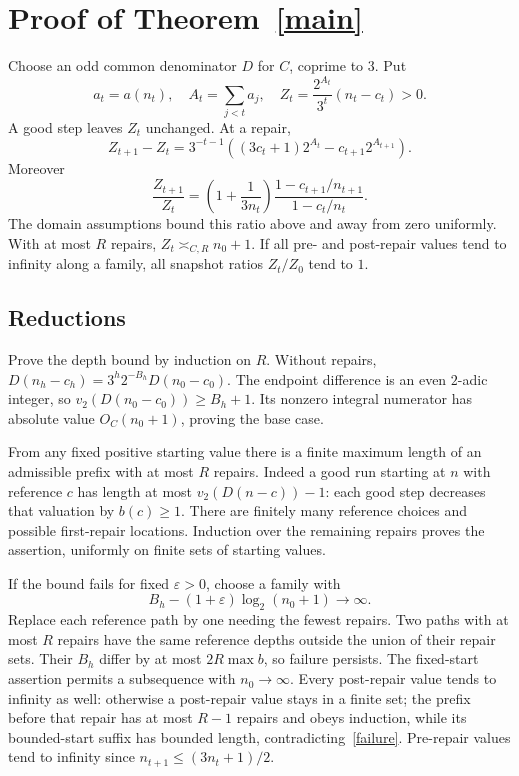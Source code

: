 \documentclass[11pt]{article}
\begin{document}
\section{Proof of Theorem~\ref{main}}
Choose an odd common denominator $D$ for $C$, coprime to $3$. Put
\[
a_t=a(n_t),\quad A_t=\sum_{j<t}a_j,\quad
Z_t=\frac{2^{A_t}}{3^t}(n_t-c_t)>0.
\]
A good step leaves $Z_t$ unchanged. At a repair,
\begin{equation}\label{increment}
Z_{t+1}-Z_t=3^{-t-1}
\left((3c_t+1)2^{A_t}-c_{t+1}2^{A_{t+1}}\right).
\end{equation}
Moreover
\begin{equation}\label{ratio}
\frac{Z_{t+1}}{Z_t}
=\left(1+\frac1{3n_t}\right)
\frac{1-c_{t+1}/n_{t+1}}{1-c_t/n_t}.
\end{equation}
The domain assumptions bound this ratio above and away from zero uniformly. With at most $R$ repairs, $Z_t\asymp_{C,R} n_0+1$.
If all pre- and post-repair values tend to infinity along a family, all snapshot ratios $Z_t/Z_0$ tend to $1$.

\subsection{Reductions}
Prove the depth bound by induction on $R$. Without repairs,
$D(n_h-c_h)=3^h2^{-B_h}D(n_0-c_0)$.
The endpoint difference is an even $2$-adic integer, so
$v_2(D(n_0-c_0))\ge B_h+1$.
Its nonzero integral numerator has absolute value $O_C(n_0+1)$, proving the base case.

From any fixed positive starting value there is a finite maximum length of an admissible prefix with at most $R$ repairs. Indeed a good run starting at $n$ with reference $c$ has length at most $v_2(D(n-c))-1$: each good step decreases that valuation by $b(c)\ge1$. There are finitely many reference choices and possible first-repair locations. Induction over the remaining repairs proves the assertion, uniformly on finite sets of starting values.

If the bound fails for fixed $\varepsilon>0$, choose a family with
\begin{equation}\label{failure}
B_h-(1+\varepsilon)\log_2(n_0+1)\longrightarrow\infty.
\end{equation}
Replace each reference path by one needing the fewest repairs. Two paths with at most $R$ repairs have the same reference depths outside the union of their repair sets. Their $B_h$ differ by at most $2R\max b$, so failure persists.
The fixed-start assertion permits a subsequence with $n_0\to\infty$.
Every post-repair value tends to infinity as well: otherwise a post-repair value stays in a finite set; the prefix before that repair has at most $R-1$ repairs and obeys induction, while its bounded-start suffix has bounded length, contradicting~\eqref{failure}. Pre-repair values tend to infinity since $n_{t+1}\le(3n_t+1)/2$.
\end{document}

